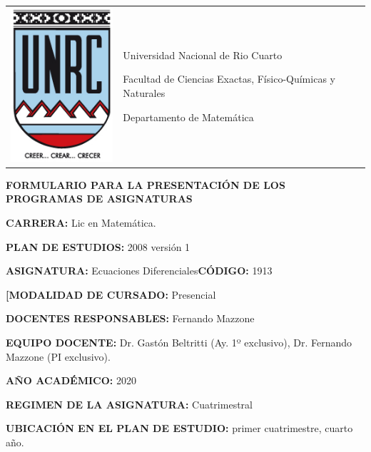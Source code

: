 \documentclass[12pt]{article}
\begin{document}
\pagestyle{plain}


\setlength{\unitlength}{1cm}
%
%

\noindent\begin{tabular}{m{} m{}}
\includegraphics[scale=.25]{escudounrc.jpg} &
{
Universidad Nacional de Rio Cuarto\par
Facultad de Ciencias Exactas, Físico-Químicas y Naturales\par
Departamento de Matemática
}
\\
\end{tabular}

\setlength{\parindent}{0pt} %

\begin{center}
 \textbf{FORMULARIO PARA LA PRESENTACIÓN DE LOS PROGRAMAS DE ASIGNATURAS}
\end{center}





 \textbf{CARRERA:}  Lic en Matemática.

 \textbf{PLAN DE ESTUDIOS:} 2008 versión 1

 \textbf{ASIGNATURA:}  Ecuaciones Diferenciales\quad\textbf{CÓDIGO:} 1913

\textbf{[MODALIDAD DE CURSADO:} Presencial
 
 \textbf{DOCENTES RESPONSABLES:} Fernando Mazzone

\textbf{EQUIPO DOCENTE:} Dr. Gastón Beltritti (Ay. 1º exclusivo), Dr. Fernando Mazzone (PI exclusivo).

\textbf{AÑO ACADÉMICO:} 2020

\textbf{REGIMEN DE LA ASIGNATURA:} Cuatrimestral

\textbf{UBICACIÓN EN EL PLAN DE ESTUDIO:} primer cuatrimestre, cuarto año.
\end{document}
